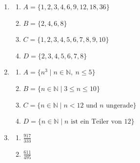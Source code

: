 \begin{enumerate}
    \item
          \begin{enumerate}
              \item \(A = \{1,2,3,4,6,9,12,18,36\}\)
              \item \(B = \{2,4,6,8\}\)
              \item \(C = \{1,2,3,4,5,6,7,8,9,10\}\)
              \item \(D = \{2,3,4,5,6,7,8\}\)
          \end{enumerate}

    \item
          \begin{enumerate}
              \item \(A = \{n^3 \mid n \in \mathbb{N},\ n \leq 5\}\)
              \item \(B = \{n \in \mathbb{N} \mid 3 \leq n \leq 10\}\)
              \item \(C = \{n \in \mathbb{N} \mid n < 12 \text{ und } n \text{ ungerade}\}\)
              \item \(D = \{n \in \mathbb{N} \mid n \text{ ist ein Teiler von } 12\}\)
          \end{enumerate}

    \item \begin{enumerate}
              \item \(\frac{917}{333}\)
              \item \(\frac{611}{495}\)
          \end{enumerate}

\end{enumerate}



